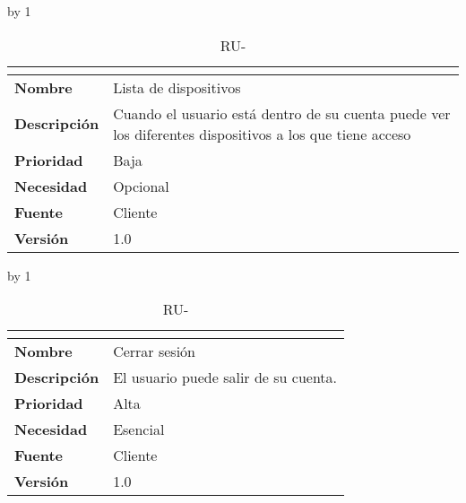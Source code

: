 \advance\ru by 1
\begin{table}[H]
	\caption{RU-\number\ru}
	\begin{tabular}{|l|p{}|}
		\hline
		\multicolumn{2}{|c|}{\cellcolor[HTML]{BFBFBF}{\color[HTML]{000000} \textbf{RU-\number\ru}}} \\ \hline
		\textbf{Nombre}      & Lista de dispositivos                                                                                   \\ \hline
		\textbf{Descripción} & Cuando el usuario está dentro de su cuenta puede ver los diferentes dispositivos a los que tiene acceso \\ \hline
		\textbf{Prioridad}   & Baja                                                                                                    \\ \hline
		\textbf{Necesidad}   & Opcional                                                                                                \\ \hline
		\textbf{Fuente}      & Cliente                                                                                                 \\ \hline
		\textbf{Versión}     & 1.0                                                                                                     \\ \hline
	\end{tabular}
\end{table}
\advance\ru by 1
\begin{table}[H]
	\caption{RU-\number\ru}
	\begin{tabular}{|l|p{}|}
		\hline
		\multicolumn{2}{|c|}{\cellcolor[HTML]{BFBFBF}{\color[HTML]{000000} \textbf{RU-\number\ru}}} \\ \hline
		\textbf{Nombre}      & Cerrar sesión                        \\ \hline
		\textbf{Descripción} & El usuario puede salir de su cuenta. \\ \hline
		\textbf{Prioridad}   & Alta                                 \\ \hline
		\textbf{Necesidad}   & Esencial                             \\ \hline
		\textbf{Fuente}      & Cliente                              \\ \hline
		\textbf{Versión}     & 1.0                                  \\ \hline
	\end{tabular}
\end{table}
